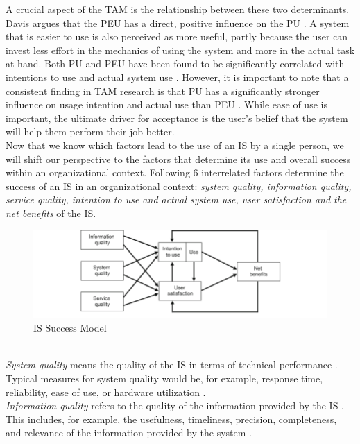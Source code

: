 \documentclass[
	english,
	ruledheaders=section,%
	class=report,%
	thesis={type=bachelor},%
	accentcolor=1b,%
	custommargins=true,%
	marginpar=false,%
	parskip=half-,%
	fontsize=11pt,%
	DIV=14,
]{tudapub}
\begin{document}
A crucial aspect of the TAM is the relationship between these two determinants. Davis argues that the PEU has a direct, positive influence on the PU \parencite[p.~334]{Davis1989}. A system that is easier to use is also perceived as more useful, partly because the user can invest less effort in the mechanics of using the system and more in the actual task at hand. Both PU and PEU have been found to be significantly correlated with intentions to use and actual system use \parencite[p.~333]{Davis1989}. However, it is important to note that a consistent finding in TAM research is that PU has a significantly stronger influence on usage intention and actual use than PEU \parencite[p.~333]{Davis1989}. While ease of use is important, the ultimate driver for acceptance is the user's belief that the system will help them perform their job better.\\
Now that we know which factors lead to the use of an IS by a single person, we will shift our perspective to the factors that determine its use and overall success within an organizational context.
Following \cite[p.~23--24]{DeloneMcLean2003ISSuccessTenYearUpdate} 6 interrelated factors determine the success of an IS in an organizational context: \textit{system quality, information quality, service quality, intention to use and actual system use, user satisfaction and the net benefits} of the IS.\\
\begin{figure}[h!]
    \includegraphics[width=1\linewidth]{images/ISSuccess.png}
    \caption{IS Success Model \parencite[p.~24]{DeloneMcLean2003ISSuccessTenYearUpdate}}
    \label{fig:enter-label}
\end{figure}
\\
\textit{System quality} means the quality of the IS in terms of technical performance \parencite[p.~64]{DeloneMcLean2003ISSuccessTenYearUpdate}. Typical measures for system quality would be, for example, response time, reliability, ease of use, or hardware utilization \parencite[p.~64--65]{DeloneMcLean1992ISSuccess}.\\
\textit{Information quality} refers to the quality of the information provided by the IS \parencite[p.~64]{DeloneMcLean1992ISSuccess}. This includes, for example, the usefulness, timeliness, precision, completeness, and relevance of the information provided by the system \parencite[p.~67]{DeloneMcLean1992ISSuccess}.\\
\end{document}
